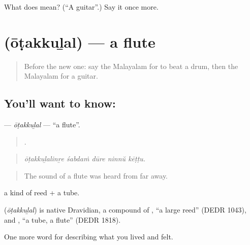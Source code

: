 \begin{tcolorbox}[breakable,colback=teal!4,colframe=teal!35!black,title={Before you move on}]
What does  mean? (\textquotedblleft{}A guitar\textquotedblright{}.) Say it once more.
\end{tcolorbox}
\section[\texorpdfstring{\ml{ഓടക്കുഴൽ} (ōṭakkuḻal)}{ഓടക്കുഴൽ (ōṭakkuḻal)}]{ (ōṭakkuḻal) — a flute}

\label{lesson:ML-C561-otakkulal}



\begin{quote}
Before the new one: say the Malayalam for to beat a drum, then the Malayalam for a guitar.
\end{quote}

\subsection*{You'll want to know: }
\textbf{} — \emph{ōṭakkuḻal} — \textquotedblleft{}a flute\textquotedblright{}.

\begin{quote}
    .
\end{quote}

\begin{quote}
\emph{ōṭakkuḻalinṟe śabdaṁ dūre ninnŭ kēṭṭu.}
\end{quote}

\begin{quote}
The sound of a flute was heard from far away.
\end{quote}

 a kind of reed +  a tube.

\begin{cousinweb}
\textbf{} (\emph{ōṭakkuḻal}) is native Dravidian, a compound of , \textquotedblleft{}a large reed\textquotedblright{} (DEDR 1043), and , \textquotedblleft{}a tube, a flute\textquotedblright{} (DEDR 1818).
\end{cousinweb}

\begin{grammarlens}[title={What you've built}]
One more word for describing what you lived and felt.
\end{grammarlens}

